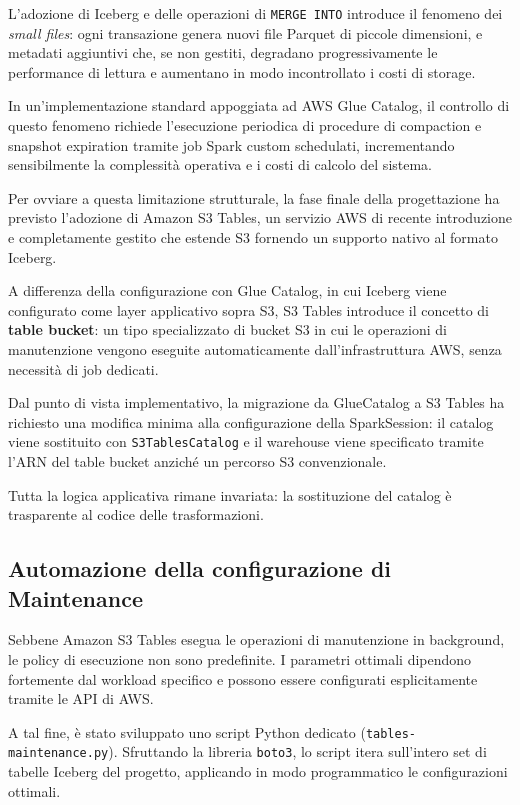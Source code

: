 \documentclass[12pt,a4paper,openright,twoside]{book}
\begin{document}
L'adozione di Iceberg e delle operazioni di \texttt{MERGE INTO} introduce il fenomeno dei \emph{small files}: 
ogni transazione genera nuovi file Parquet di piccole dimensioni, e
metadati aggiuntivi che, se non gestiti, degradano progressivamente le performance
di lettura e aumentano in modo incontrollato i costi di storage.

In un’implementazione standard appoggiata ad AWS Glue Catalog, il controllo
di questo fenomeno richiede l’esecuzione periodica di procedure
di compaction e snapshot expiration tramite job Spark custom schedulati,
incrementando sensibilmente la complessità operativa e i costi di calcolo del sistema.

Per ovviare a questa limitazione strutturale, la fase finale della progettazione
ha previsto l’adozione di Amazon S3 Tables, un servizio AWS di recente introduzione e 
completamente gestito che estende S3 fornendo un supporto nativo al formato Iceberg. \cite{S3TablesDocs}

A differenza della configurazione con Glue Catalog, in cui Iceberg viene configurato come layer applicativo sopra S3,
S3 Tables introduce il concetto di \textbf{table bucket}: un tipo specializzato di bucket S3 in cui le operazioni
di manutenzione vengono eseguite automaticamente dall'infrastruttura AWS, senza necessità di job dedicati.

Dal punto di vista implementativo, la migrazione da GlueCatalog a S3 Tables ha richiesto una modifica minima alla configurazione 
della SparkSession: il catalog viene sostituito con \texttt{S3TablesCatalog} e il warehouse viene specificato tramite l'ARN del table bucket anziché un percorso S3 convenzionale.

Tutta la logica applicativa rimane invariata: la sostituzione del catalog è trasparente al codice delle trasformazioni.

\subsection{Automazione della configurazione di Maintenance}

Sebbene Amazon S3 Tables esegua le operazioni di manutenzione in background, le policy di esecuzione non sono predefinite. 
I parametri ottimali dipendono fortemente dal workload specifico e possono essere configurati esplicitamente tramite le API di AWS.

A tal fine, è stato sviluppato uno script Python dedicato (\texttt{tables-maintenance.py}). Sfruttando la libreria \texttt{boto3}, lo script itera sull'intero set di tabelle Iceberg del progetto, applicando in modo programmatico le configurazioni ottimali.
\end{document}
